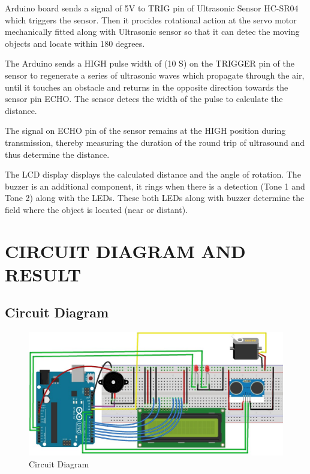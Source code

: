 \documentclass[13pt,a4paper]{report}
\begin{document}
                    \large{
                        Arduino board sends a signal of 5V to TRIG pin of Ultrasonic Sensor HC-SR04 
                    which triggers the sensor. Then it procides rotational action at the servo motor mechanically 
                    fitted along with Ultrasonic sensor so that it can detec the moving objects and locate within 
                    180 degrees. \\ 
                    \vspace{1mm}
                    \par The Arduino sends a HIGH pulse width of (10 S) on the TRIGGER pin of the sensor to 
                    regenerate  a series of ultrasonic waves which propagate through the air, until it touches 
                    an obstacle and returns in the opposite direction towards the sensor pin ECHO. The sensor 
                    detecs the width of the pulse to calculate the distance. \\
                    \vspace{1mm}
                    \par The signal on ECHO pin of the sensor remains at the HIGH position during transmission, 
                    thereby measuring the duration of the round trip of ultrasound and thus determine the distance. \\
                    \vspace{1mm}
                    \par The LCD display displays the calculated distance and the angle of rotation. The buzzer 
                    is an additional component, it rings when there is a detection (Tone 1 and Tone 2) along 
                    with the LEDs. These both LEDs along with buzzer determine the field where the object is 
                    located (near or distant). \\}
        \section{CIRCUIT DIAGRAM AND RESULT}
            \subsection{\large{Circuit Diagram}}
                \begin{figure}[H]
                    \centering
                    \includegraphics[width=\linewidth]{circuit.jpg}
                    \caption{\label{fig:pic}Circuit Diagram}
                \end{figure}
\end{document}
